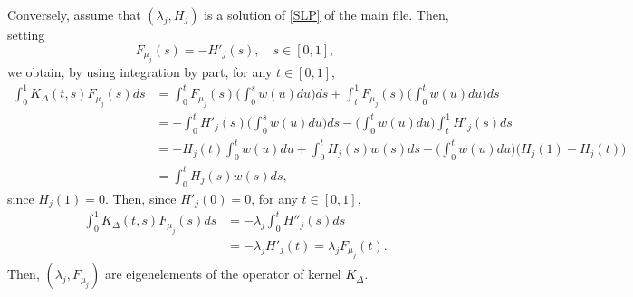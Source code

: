 \documentclass[aos]{imsart}
\theoremstyle{plain}
\theoremstyle{remark}
\newcommand{\1}{1}
\begin{document}
Conversely, assume that $(\lambda_j,H_j)$ is a solution of \eqref{SLP} of the main file.  Then, setting
$$F_{\mu_j}(s)=-H'_j(s),\quad s\in[0,1],$$
we obtain, by using integration by part, for any $t\in[0,1]$,
\begin{align*}
\int_0^1K_\Delta(t,s)F_{\mu_j}(s)ds&=\int_0^tF_{\mu_j}(s)\Big(\int_0^s w(u)du\Big)ds+\int_t^1F_{\mu_j}(s)\Big(\int_0^t w(u)du\Big)ds\\
&=-\int_0^tH'_j(s)\Big(\int_0^s w(u)du\Big)ds-\Big(\int_0^t w(u)du\Big)\int_t^1H'_j(s)ds\\
&=-H_j(t)\int_0^tw(u)du+\int_0^tH_j(s)w(s)ds-\Big(\int_0^t w(u)du\Big)\Big(H_j(1)-H_j(t)\Big)\\
&=\int_0^tH_j(s)w(s)ds,
\end{align*}
since $H_j(1)=0$. Then, since $H'_j(0)=0$, for any $t\in[0,1]$,
\begin{align*}
\int_0^1K_\Delta(t,s)F_{\mu_j}(s)ds&=-\lambda_j\int_0^tH''_j(s)ds\\
&=-\lambda_jH'_j(t)=\lambda_jF_{\mu_j}(t).
\end{align*}
Then, 
$(\lambda_j,F_{\mu_j})$ are eigenelements of the operator of kernel $K_\Delta$.


\iffalse
\end{document}
